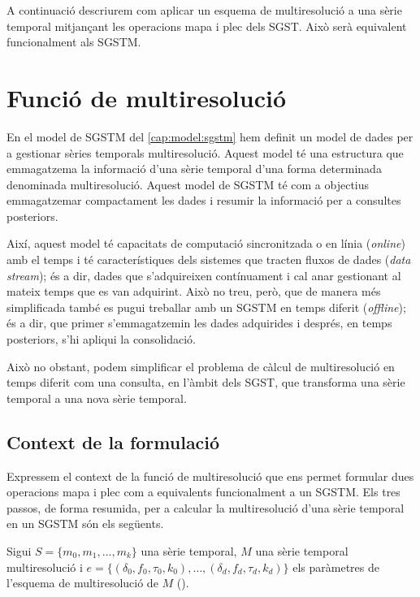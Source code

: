 A continuació descriurem com aplicar un esquema de
multiresolució a una sèrie temporal mitjançant les operacions mapa i
plec dels \gls{SGST}. Això serà equivalent funcionalment als
\gls{SGSTM}.



\section{Funció de multiresolució}
\label{sec:multiresolucio:funcio}



En el model de \gls{SGSTM} del \autoref{cap:model:sgstm} hem definit
un model de dades per a gestionar sèries temporals
multiresolució. Aquest model té una estructura que emmagatzema la
informació d'una sèrie temporal d'una forma determinada denominada
multiresolució.  Aquest model de \gls{SGSTM} té com a objectius
emmagatzemar compactament les dades i resumir la informació per a
consultes posteriors.

Així, aquest model té capacitats de computació sincronitzada o en
línia (\emph{online}) amb el temps i té característiques dels sistemes
que tracten fluxos de dades (\emph{data stream}); és a dir, dades que
s'adquireixen contínuament i cal anar gestionant al mateix temps que
es van adquirint. Això no treu, però, que de manera més simplificada
també es pugui treballar amb un \gls{SGSTM} en temps diferit
(\emph{offline}); és a dir, que primer s'emmagatzemin les dades
adquirides i després, en temps posteriors, s'hi apliqui la consolidació.



Això no obstant, podem simplificar el problema de càlcul de
multiresolució en temps diferit com una consulta, en l'àmbit dels
\gls{SGST}, que transforma una sèrie temporal a una nova sèrie
temporal.




\subsection{Context de la formulació}

Expressem el context de la funció de multiresolució que ens permet
formular dues operacions mapa i plec com a equivalents funcionalment a
un \gls{SGSTM}.
%
Els tres passos, de forma resumida, per a calcular la multiresolució
d'una sèrie temporal en un \gls{SGSTM} són els següents.


Sigui $S=\{m_0,m_1,\dotsc,m_k\}$ una sèrie temporal, $M$ una sèrie
temporal multiresolució i $e = \{ (\delta_0,f_0,\tau_0,k_0), \ldots,
(\delta_d,f_d,\tau_d,k_d)\}$ els paràmetres de l'esquema de
multiresolució de $M$ (). 


